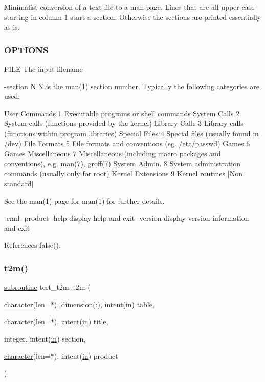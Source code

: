 Minimalist conversion of a text file to a man page. Lines that are all upper-\/case starting in column 1 start a section. Otherwise the sections are printed essentially as-\/is.

\subsubsection*{O\+P\+T\+I\+O\+NS}

F\+I\+LE The input filename

-\/section N N is the man(1) section number. Typically the following categories are used\+:

User Commands 1 Executable programs or shell commands System Calls 2 System calls (functions provided by the kernel) Library Calls 3 Library calls (functions within program libraries) Special Files 4 Special files (usually found in /dev) File Formats 5 File formats and conventions (eg. /etc/passwd) Games 6 Games Miscellaneous 7 Miscellaneous (including macro packages and conventions), e.\+g. man(7), groff(7) System Admin. 8 System administration commands (usually only for root) Kernel Extensions 9 Kernel routines \mbox{[}Non standard\mbox{]}

See the man(1) page for man(1) for further details.

-\/cmd -\/product -\/help display help and exit -\/version display version information and exit 

References false().

\mbox{\label{t2m_8f90_ab191ed2a41113781c7994c9642cfbbab}} 
\subsubsection{\texorpdfstring{t2m()}{t2m()}}
{\footnotesize\ttfamily \hyperlink{M__stopwatch_83_8txt_acfbcff50169d691ff02d4a123ed70482}{subroutine} test\+\_\+t2m\+::t2m (\begin{DoxyParamCaption}\item[{\hyperlink{option__stopwatch_83_8txt_abd4b21fbbd175834027b5224bfe97e66}{character}(len=$\ast$), dimension(\+:), intent(\hyperlink{M__journal_83_8txt_afce72651d1eed785a2132bee863b2f38}{in})}]{table,  }\item[{\hyperlink{option__stopwatch_83_8txt_abd4b21fbbd175834027b5224bfe97e66}{character}(len=$\ast$), intent(\hyperlink{M__journal_83_8txt_afce72651d1eed785a2132bee863b2f38}{in})}]{title,  }\item[{integer, intent(\hyperlink{M__journal_83_8txt_afce72651d1eed785a2132bee863b2f38}{in})}]{section,  }\item[{\hyperlink{option__stopwatch_83_8txt_abd4b21fbbd175834027b5224bfe97e66}{character}(len=$\ast$), intent(\hyperlink{M__journal_83_8txt_afce72651d1eed785a2132bee863b2f38}{in})}]{product }\end{DoxyParamCaption})}



